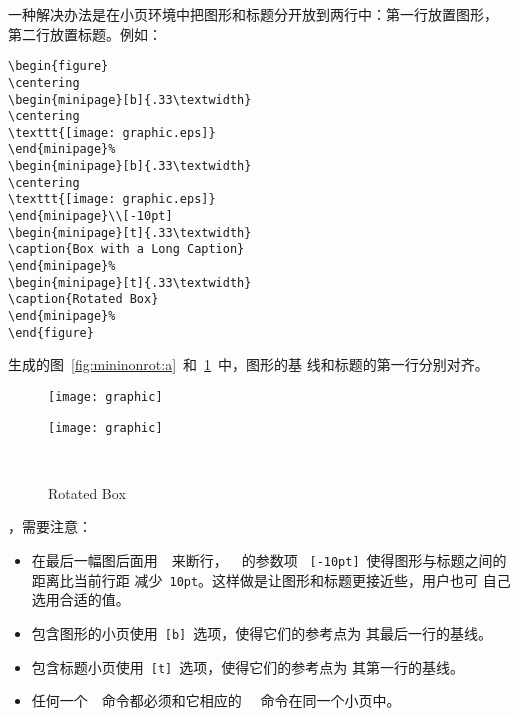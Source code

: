 一种解决办法是在小页环境中把图形和标题分开放到两行中：第一行放置图形，
第二行放置标题。例如：
\begin{Verbatim}[xleftmargin=1cm]
\begin{figure} 
\centering 
\begin{minipage}[b]{.33\textwidth} 
\centering 
\texttt{[image: graphic.eps]} 
\end{minipage}% 
\begin{minipage}[b]{.33\textwidth} 
\centering 
\texttt{[image: graphic.eps]} 
\end{minipage}\\[-10pt] 
\begin{minipage}[t]{.33\textwidth} 
\caption{Box with a Long Caption} 
\end{minipage}% 
\begin{minipage}[t]{.33\textwidth} 
\caption{Rotated Box} 
\end{minipage}% 
\end{figure}
\end{Verbatim}
生成的图~\ref{fig:mininonrot:a}~和~\ref{fig:minirot:a}~中，图形的基
线和标题的第一行分别对齐。

\begin{figure}
	\centering
	\begin{minipage}[b]{.33\textwidth}
		\centering
		\texttt{[image: graphic]}
	\end{minipage}%
	\begin{minipage}[b]{.33\textwidth}\label{fig:mininonrot:a}
		\centering
		\texttt{[image: graphic]}
	\end{minipage}\\[-10pt]
	\begin{minipage}[t]{.33\textwidth}
		\caption{Box with a Long Caption}
	\end{minipage}%
	\begin{minipage}[t]{.33\textwidth}
		\caption{Rotated Box}\label{fig:minirot:a}
	\end{minipage}%
\end{figure}

，需要注意：
\begin{itemize}
	\item 在最后一幅图后面用~\cmd{\bs}~来断行，~\cmd{\bs}~的参数项
	~\texttt{[-10pt]}~使得图形与标题之间的距离比当前行距
	减少~\texttt{10pt}。这样做是让图形和标题更接近些，用户也可
	自己选用合适的值。
	\item 包含图形的小页使用~\texttt{[b]}~选项，使得它们的参考点为
	其最后一行的基线。
	\item 包含标题小页使用~\texttt{[t]}~选项，使得它们的参考点为
	其第一行的基线。
	\item 任何一个~~命令都必须和它相应的~~
	命令在同一个小页中。
\end{itemize}


